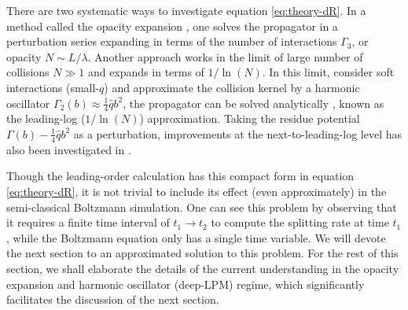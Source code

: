 There are two systematic ways to investigate equation \ref{eq:theory-dR}.
In a method called the opacity expansion \cite{Wiedemann:2000za,Gyulassy:1999zd}, one solves the propagator in a perturbation series expanding in terms of the number of interactions $\Gamma_3$, or opacity $N \sim L/\lambda$.
Another approach works in the limit of large number of collisions $N\gg 1$ and expands in terms of $1/\ln(N)$.
In this limit, consider soft interactions (small-$q$) and approximate the collision kernel by a harmonic oscillator  $\Gamma_2(b) \approx \frac{1}{4}\hat{q}b^2$, the propagator can be solved analytically \cite{Baier:1996kr,Baier:1998yf,Baier:1996sk},  known as the leading-log ($1/\ln(N)$) approximation.
Taking the residue potential $\Gamma(b) - \frac{1}{4}\hat{q}b^2$ as a perturbation, improvements at the next-to-leading-log level has also been investigated in \cite{Arnold:2008zu,Mehtar-Tani:2019tvy}.

Though the leading-order calculation has this compact form in equation \ref{eq:theory-dR}, it is not trivial to include its effect (even approximately) in the semi-classical Boltzmann simulation.
One can see this problem by observing that it requires a finite time interval of $t_1 \rightarrow t_2$ to compute the splitting rate at time $t_1$, while the Boltzmann equation only has a single time variable. 
We will devote the next section to an approximated solution to this problem.
For the rest of this section, we shall elaborate the details of the current understanding in the opacity expansion and harmonic oscillator (deep-LPM) regime, which significantly facilitates the discussion of the next section.

